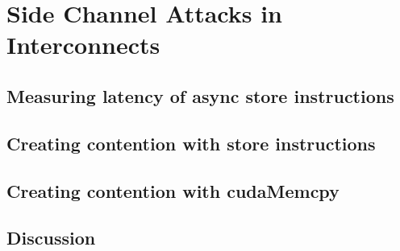 \chapter{Side Channel Attacks in Interconnects}

\section{Measuring latency of async store instructions}\label{sec:async-stores}
\section{Creating contention with store instructions}\label{sec:contention-with-stores}
\section{Creating contention with cudaMemcpy}\label{sec:contention-with-cudamemcpy}
\section{Discussion}\label{sec:interconnect-sc-discussion}

\endinput

Should we consider the pre-microcode-update results and talk about that? It is NOT a vulnerability, just a behavioural observation, hence, I don't think we need responsible disclosure